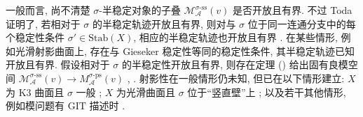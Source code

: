 一般而言, 尚不清楚 $\sigma$-半稳定对象的子叠 $\mathcal M_{\mathcal A}^{\sigma\text{-}\mathrm{ss}}(v)$ 是否开放且有界. 不过 Toda 证明了, 若相对于 $\sigma$ 的半稳定轨迹开放且有界, 则对与 $\sigma$ 位于同一连通分支中的每个稳定性条件 $\sigma'\in\mathrm{Stab}(X)$, 相应的半稳定轨迹也开放且有界 \cite{Tod08,PT19}. 在某些情形, 例如光滑射影曲面上, 存在与 Gieseker 稳定性等同的稳定性条件, 其半稳定轨迹已知开放且有界. 假设相对于 $\sigma$ 的半稳定性开放且有界, 则存在定理 () 给出固有良模空间 $\mathcal M_{\mathcal A}^{\sigma\text{-}\mathrm{ss}}(v)\to M_{\mathcal A}^{\sigma\text{-}\mathrm{ps}}(v)$ \cite[\S7]{AHLH23}, \cite{BLM+21}. 射影性在一般情形仍未知, 但已在以下情形建立: $X$ 为 K3 曲面且 $\sigma$ 一般 \cite{BM14}; $X$ 为光滑曲面且 $\sigma$ 位于``竖直壁''上 \cite{Taj23}; 以及若干其他情形, 例如模问题有 GIT 描述时 \cite{ABCH13,AM17}.
